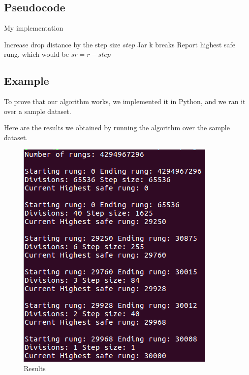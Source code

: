\documentclass{article}
\begin{document}
\subsection*{Pseudocode}

\begin{algorithm}[H]
\caption{My implementation}
\begin{algorithmic}[1]
  \State Increase drop distance by the step size $step$
   \State Jar k  breaks
   \State Report highest safe rung, which would be $sr = r - step$

   \EndIf
  \EndIf
 \EndWhile
\EndFunction
\end{algorithmic}
\end{algorithm}

\subsection*{Example}

To prove that our algorithm works, we implemented it in Python, and we ran it over a sample dataset.



Here are the results we obtained by running the algorithm over the sample dataset.

\begin{figure}[H]
\begin{center}
\includegraphics[scale=.8]{problem1b}
\end{center}
\caption{Results}
\end{figure}
\end{document}
